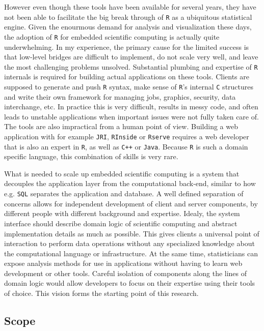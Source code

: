 \documentclass{article}
\newcommand{\R}{\texttt{R}\xspace}
\begin{document}
However even though these tools have been available for several years, they have not been able to facilitate the big break through of \R as a ubiquitous statistical engine. Given the enourmous demand for analysis and visualization these days, the adoption of \R for embedded scientific computing is actually quite underwhelming. In my experience, the primary cause for the limited success is that low-level bridges are difficult to implement, do not scale very well, and leave the most challenging problems unsolved. Substantial plumbing and expertise of \R internals is required for building actual applications on these tools. Clients are supposed to generate and push \R syntax, make sense of \R's internal \texttt{C} structures and write their own framework for managing jobs, graphics, security, data interchange, etc. In practice this is very difficult, results in messy code, and often leads to unstable applications when important issues were not fully taken care of. The tools are also impractical from a human point of view. Building a web application with for example \texttt{JRI}, \texttt{RInside} or \texttt{Rserve} requires a web developer that is also an expert in \R, as well as \texttt{C++} or \texttt{Java}. Because \R is such a domain specific language, this combination of skills is very rare. 

What is needed to scale up embedded scientific computing is a system that decouples the application layer from the computational back-end, similar to how e.g. \texttt{SQL} separates the application and database. A well defined separation of concerns allows for independent development of client and server components, by different people with different background and expertise. Idealy, the system interface should describe domain logic of scientific computing and abstract implementation details as much as possible. This gives clients a universal point of interaction to perform data operations without any specialized knowledge about the computational language or infrastructure. At the same time, statisticians can expose analysis methods for use in applications without having to learn web development or other tools. Careful isolation of components along the lines of domain logic would allow developers to focus on their expertise using their tools of choice. This vision forms the starting point of this research. 


\subsection{Scope}
\end{document}
